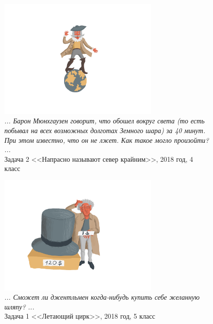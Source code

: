 \documentclass[10pt]{scrbook} \usepackage{modules/nonstahp_book}
\begin{document}
\begin{figure} \begin{center}
	\includegraphics[width=8cm]{figures/color/12}
	\caption{
             {\itshape ... Барон Мюнхгаузен говорит, что обошел вокруг света (то есть побывал на 
              всех возможных долготах Земного шара) за 40 минут. При этом известно, что он не лжет. 
              Как такое могло произойти? ...}\\
             {Задача 2 <<Напрасно называют север крайним>>, 2018 год, 4 класс}}
\end{center} \end{figure}


\begin{figure} \begin{center}
	\includegraphics[width=8cm]{figures/color/13}
	\caption{
             {\itshape ... Сможет ли джентльмен когда-нибудь купить себе желанную шляпу? ...}\\
             {Задача 1 <<Летающий цирк>>, 2018 год, 5 класс}}
\end{center} \end{figure}
\end{document}
